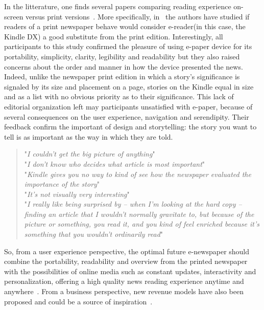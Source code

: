 \documentclass[10pt]{article}
\begin{document}

In the litterature, one finds several papers comparing reading experience on-screen versus print versions~\cite{hollander-krugman-etal:11,walsh:16,neijens-voorveld:18}. More specifically, in~\cite{hollander-krugman-etal:11} the authors have studied if readers of a print newspaper behave would consider e-reader(in this case, the Kindle DX)  a good substitute from the print edition. Interestingly, all participants to this study confirmed the pleasure of using e-paper device for its portability, simplicity, clarity, legibility and readability but they also raised  concerns about the order and manner in how the device presented the news.
Indeed, unlike the newspaper print edition in which a story’s significance is signaled by its size and placement on a page, stories on the Kindle equal in size and as a list with no obvious priority as to their significance. This lack of editorial organization left may participants unsatisfied with e-paper, because of several consequences on the user experience, navigation and serendipity. Their feedback confirm the important of design and storytelling: the story you want to tell is as important as the way in which they are told. 
\begin{quote}
"{\itshape I couldn’t get the big picture of anything}"\\
"{\itshape I don’t know who decides what article is most important}"\\
"{\itshape Kindle gives you no way to kind of see how the newspaper evaluated the importance of the story}"\\
"{\itshape It's not visually very interesting}"\\
"{\itshape I really like being surprised by -- when I’m looking at the hard copy -- finding an article that I wouldn’t normally gravitate to, but because of the picture or something, you read it, and you kind of feel enriched because it’s something that you wouldn’t ordinarily read}"
\end{quote}

So, from a user experience perspective, the optimal future e-newspaper should combine the portability, readability and overview from the printed newspaper with the possibilities of online media such as constant updates, interactivity and personalization, offering a high quality news reading experience anytime and anywhere~\cite{ihlstrom-eriksson-etal:04}. From a business perspective, new revenue models have also been proposed and could be a source of inspiration~\cite{ihlstrom-kalling-etal:08,akesson:09}.
\end{document}
